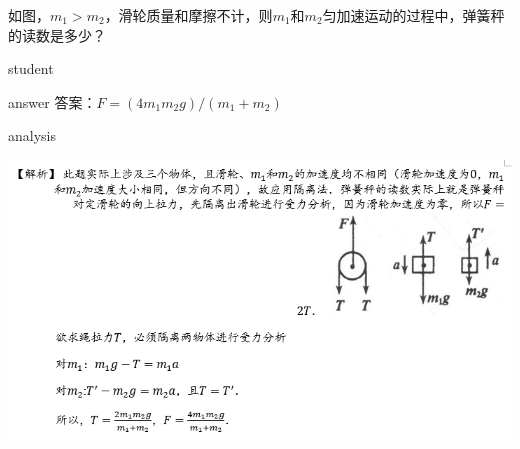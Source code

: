 \begin{example}
	如图，$ m_1>m_2 $，滑轮质量和摩擦不计，则$ m_1 $和$ m_2 $匀加速运动的过程中，弹簧秤的读数是多少？
	
	\begin{taggedblock}{student}
		\vspace*{2cm}
	\end{taggedblock}
	
	
	\begin{taggedblock}{answer}
		答案：$ F=(4m_1 m_2 g)/(m_1+m_2 ) $
	\end{taggedblock}
	
	
	\begin{taggedblock}{analysis}
			\begin{center}
				\includegraphics[width=0.9\linewidth]{image/newton-7}
			\end{center}
	\end{taggedblock}
\end{example}


